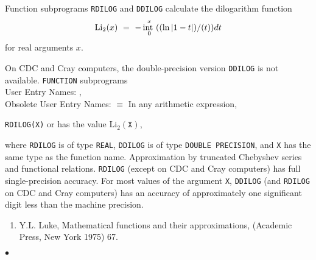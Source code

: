                                
                          
\Submitter{}                                  
                          
Function subprograms {\tt RDILOG} and {\tt DDILOG} calculate
the dilogarithm function
$$ \mbox{\rm Li}_2(x) \ = \ -\int_0^x \frac{\ln|1-t|}{t} dt $$
for real arguments $x$.
\par
On CDC and Cray computers, the double-precision version
{\tt DDILOG} is not available.
\Structure
{\tt FUNCTION} subprograms\\
User Entry  Names: ,  \\
Obsolete User Entry Names:  $\equiv$ 
\Usage
In any arithmetic expression,
\begin{center}
{\tt RDILOG(X)} \quad or  \quad has the value \quad
Li$_2(\mathtt{X})$,
\end{center}
where {\tt RDILOG} is of type {\tt REAL}, {\tt DDILOG} is of type
{\tt DOUBLE PRECISION}, and {\tt X} has the same type
as the function name.
\Method
Approximation by truncated Chebyshev series and functional relations.
\Accuracy
{\tt RDILOG} (except on CDC and Cray computers)
has full single-precision accuracy.
For most values of the argument {\tt X}, {\tt DDILOG}
(and {\tt RDILOG} on CDC and Cray computers) has an accuracy of
approximately one significant digit less than the machine precision.
\Refer
\begin{enumerate}
\item Y.L. Luke, Mathematical functions and their approximations,
(Academic Press, New York 1975) 67.
\end{enumerate}
$\bullet$
